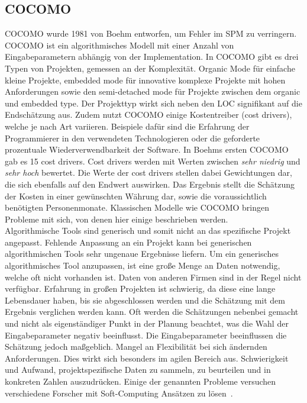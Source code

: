 \subsection{COCOMO}
 COCOMO wurde 1981 von Boehm entworfen, um Fehler im SPM zu verringern. COCOMO ist ein algorithmisches Modell mit einer Anzahl von Eingabeparametern abhängig von der Implementation. In COCOMO gibt es drei Typen von Projekten, gemessen an der Komplexität. Organic Mode für einfache kleine Projekte, embedded mode für innovative komplexe Projekte mit hohen Anforderungen sowie den semi-detached mode für Projekte zwischen dem organic und embedded type. Der Projekttyp wirkt sich neben den LOC signifikant auf die Endschätzung aus. Zudem nutzt COCOMO einige Kostentreiber (cost drivers), welche je nach Art variieren. Beispiele dafür sind die Erfahrung der Programmierer in den verwendeten Technologieren oder die geforderte prozentuale Wiederverwendbarkeit der Software. In Boehms ersten COCOMO gab es 15 cost drivers. Cost drivers werden mit Werten zwischen \textit{sehr niedrig} und \textit{sehr hoch} bewertet. Die Werte der cost drivers stellen dabei Gewichtungen dar, die sich ebenfalls auf den Endwert auswirken. Das Ergebnis stellt die Schätzung der Kosten in einer gewünschten Währung dar, sowie die voraussichtlich benötigten Personenmonate. Klassischen Modelle wie COCOMO bringen Probleme mit sich, von denen hier einige beschrieben werden.
 \\
Algorithmische Tools sind generisch und somit nicht an das spezifische Projekt angepasst. Fehlende Anpassung an ein Projekt kann bei generischen algorithmischen Tools sehr ungenaue Ergebnisse liefern. Um ein generisches algorithmisches Tool anzupassen, ist eine große Menge an Daten notwendig, welche oft nicht vorhanden ist. Daten von anderen Firmen sind in der Regel nicht verfügbar. Erfahrung in großen Projekten ist schwierig, da diese eine lange Lebensdauer haben, bis sie abgeschlossen werden und die Schätzung mit dem Ergebnis verglichen werden kann. Oft werden die Schätzungen nebenbei gemacht und nicht als eigenständiger Punkt in der Planung beachtet, was die Wahl der Eingabeparameter negativ beeinflusst. Die Eingabepara\-meter beeinflussen die Schätzung jedoch maßgeblich. Mangel an Flexibilität bei sich ändernden Anforderungen. Dies wirkt sich besonders im agilen Bereich aus. Schwierigkeit und Aufwand, projektspezifische Daten zu sammeln, zu beurteilen und in konkreten Zahlen auszudrücken. Einige der genannten Probleme versuchen verschiedene Forscher mit Soft-Computing Ansätzen zu lösen~\cite{Bilgaiyan2016}\cite{Chen2005}\cite{Heemstra1992}\cite{Abrahamsson2007}.
\vspace{6.0cm}
